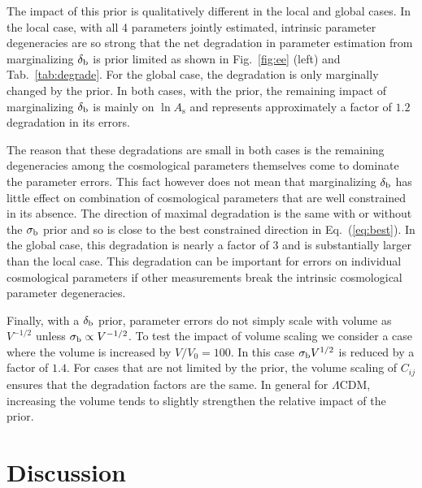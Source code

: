 \documentclass[prd,twocolumn,amsmath,amssymb,floatfix,superscriptaddress]{revtex4-1}
\newcommand{\lnAs}{{\ln\!A_\textrm{s}}}
\newcommand{\br}{{\rm b}}
\begin{document}
{{The impact of this prior is qualitatively different in the local and global cases.
In the local case, with all 4 parameters jointly estimated,
intrinsic parameter degeneracies are so strong that the net
degradation in parameter estimation from marginalizing $\delta_\br$ is prior limited
as shown in Fig.~\ref{fig:ee} (left) and Tab.~\ref{tab:degrade}.    For the global case, the degradation is
only marginally changed by the prior.   
In both cases, with the prior, the remaining impact of marginalizing $\delta_\br$ is mainly on
$\lnAs$ and represents approximately a factor of $1.2$ degradation in its errors.


The reason that these degradations are small in both cases is the remaining degeneracies
among the cosmological parameters themselves come to dominate the parameter errors.
This fact however does not mean that marginalizing $\delta_\br$ has little effect
on combination of cosmological parameters that are well constrained in its absence.   
The direction of maximal degradation is the same with or  without the $\sigma_\br$ prior
and so is close to the best constrained direction in Eq.~(\ref{eq:best}).   In the
global case, this degradation is nearly a factor of 3 and is substantially larger than
the local case.   This degradation can be important for errors on individual cosmological
parameters if other measurements break the intrinsic cosmological
parameter degeneracies.


 
Finally, with a $\delta_\br$ prior, parameter errors do not simply scale with volume as
$V^{-1/2}$ unless $\sigma_\br \propto V^{-1/2}$.    To test the impact of volume scaling
we consider a case where the volume is increased by $V/V_0=100$.   In this case
$\sigma_\br V^{1/2}$ is reduced by a factor of $1.4$.
For cases that are not
limited by the prior, the volume scaling of $C_{ij}$ ensures that the degradation factors
are the same.
In general for $\Lambda$CDM, 
increasing the volume tends to slightly
strengthen the relative impact of the prior.






\section{Discussion}
\label{sec:discussion}

}}
\end{document}

